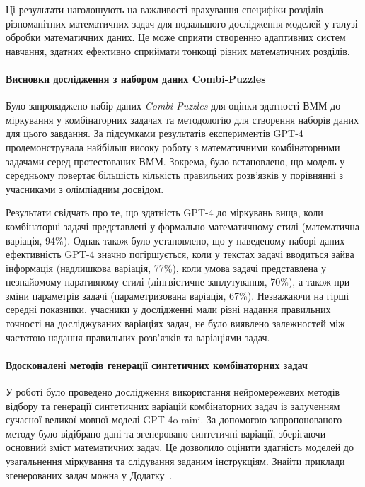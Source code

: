 Ці результати наголошують на важливості врахування специфіки розділів різноманітних математичних задач для подальшого дослідження моделей у галузі обробки математичних даних. Це може сприяти створенню адаптивних систем навчання, здатних ефективно сприймати тонкощі різних математичних розділів.

\paragraph{Висновки дослідження з набором даних Combi-Puzzles}
Було запроваджено набір даних \emph{Combi-Puzzles} для оцінки здатності ВММ до міркування у комбінаторних задачах та методологію для створення наборів даних для цього завдання. За підсумками результатів експериментів GPT-4 продемонструвала найбільш високу роботу з математичними комбінаторними задачами серед протестованих ВММ. Зокрема, було встановлено, що модель у середньому повертає більшість кількість правильних розв'язків у порівнянні з учасниками з олімпіадним досвідом.

Результати свідчать про те, що здатність GPT-4 до міркувань вища, коли комбінаторні задачі представлені у формально-математичному стилі (математична варіація, 94\%). Однак також було установлено, що у наведеному наборі даних ефективність GPT-4 значно погіршується, коли у текстах задачі вводиться зайва інформація (надлишкова варіація, 77\%), коли умова задачі представлена у незнайомому наративному стилі (лінгвістичне заплутування, 70\%), а також при зміни параметрів задачі (параметризована варіація, 67\%). Незважаючи на гірші середні показники, учасники у дослідженні мали різні  надання правильних точності на досліджуваних варіаціях задач, не було виявлено залежностей між частотою надання правильних розв'язків та варіаціями задач.

\paragraph{Вдосконалені методів генерації синтетичних комбінаторних задач}
У роботі було проведено дослідження використання нейромережевих методів відбору та генерації синтетичних варіацій комбінаторних задач із залученням сучасної великої мовної моделі GPT-4o-mini. За допомогою запропонованого методу було відібрано дані та згенеровано синтетичні варіації, зберігаючи основний зміст математичних задач. Це дозволило оцінити здатність моделей до узагальнення міркування та слідування заданим інструкціям. Знайти приклади згенерованих задач можна у Додатку~.


